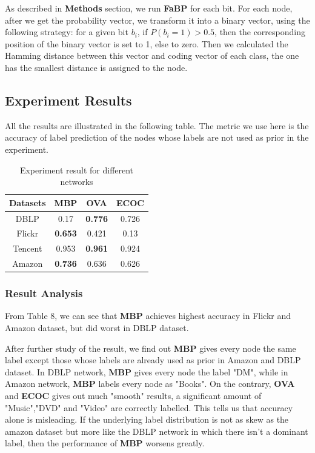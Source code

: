 As described in \textbf{Methods} section, we run \textbf{FaBP} for each bit. For each node, after we get the probability vector, we transform it into a binary vector, using the following strategy: for a given bit $b_i$, if $P(b_i=1) > 0.5$, then the corresponding position of the binary vector is set to 1, else to zero. Then we calculated the Hamming distance between this vector and coding vector of each class, the one has the smallest distance is assigned to the node. 

\subsection{Experiment Results}
All the results are illustrated in the following table. The metric we use here is the accuracy of label prediction of the nodes whose labels are not used as prior in the experiment.
\begin{table}[!ht]
\centering
\begin{tabular}{c|ccc}
\toprule
\textbf{Datasets} & \textbf{MBP} & \textbf{OVA} & \textbf{ECOC}\\
\midrule
DBLP &0.17 &\textbf{0.776} &0.726\\
Flickr & \textbf{0.653} & 0.421 & 0.13\\
Tencent & 0.953 & \textbf{0.961} & 0.924\\
Amazon & \textbf{0.736} & 0.636 & 0.626\\
\bottomrule
\end{tabular}
\caption{Experiment result for different networks}
\end{table}

\subsubsection*{Result Analysis}
From Table 8, we can see that \textbf{MBP} achieves highest accuracy in Flickr and Amazon dataset, but did worst in DBLP dataset. 

After further study of the result, we find out \textbf{MBP} gives every node the same label except those whose labels are already used as prior in Amazon and DBLP dataset. In DBLP network, \textbf{MBP} gives every node the label "DM", while in Amazon network, \textbf{MBP} labels every node as "Books". On the contrary,  \textbf{OVA} and \textbf{ECOC} gives out much "smooth" results, a significant amount of "Music","DVD" and "Video" are correctly labelled. This tells us that accuracy alone is misleading. If the underlying label distribution is not as skew as the amazon dataset but more like the DBLP network in which there isn't a dominant label, then the performance of \textbf{MBP} worsens greatly. 

